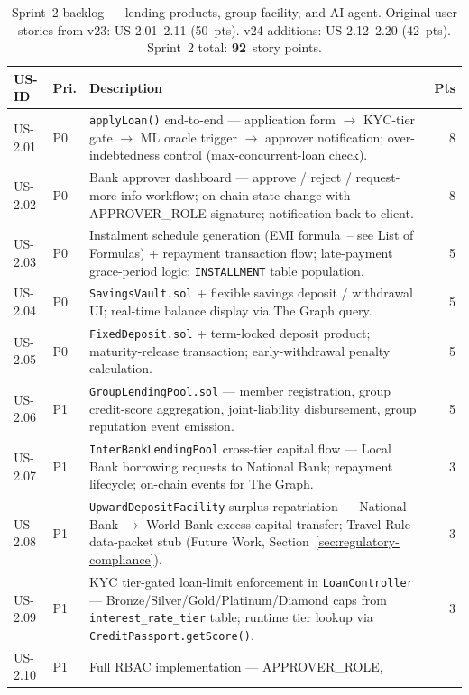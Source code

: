 \begin{table}[H]
\centering
\caption{Sprint~2 backlog --- lending products, group facility, and AI agent.
Original user stories from v23: US-2.01--2.11 (50~pts). v24 additions:
US-2.12--2.20 (42~pts). Sprint~2 total: \textbf{92}~story points.}
\label{tab:sprint2}
\small
\begin{tabular}{p{1.3cm}p{1.0cm}p{8.4cm}r}
\hline
\textbf{US-ID} & \textbf{Pri.} & \textbf{Description} & \textbf{Pts} \\
\hline
US-2.01 & P0 & \texttt{applyLoan()} end-to-end --- application form $\to$
  KYC-tier gate $\to$ ML oracle trigger $\to$ approver notification;
  over-indebtedness control (max-concurrent-loan check). & 8 \\
US-2.02 & P0 & Bank approver dashboard --- approve / reject / request-more-info
  workflow; on-chain state change with APPROVER\_ROLE signature;
  notification back to client. & 8 \\
US-2.03 & P0 & Instalment schedule generation (EMI formula~-- see List of
  Formulas) + repayment transaction flow; late-payment grace-period logic;
  \texttt{INSTALLMENT} table population. & 5 \\
US-2.04 & P0 & \texttt{SavingsVault.sol} + flexible savings deposit /
  withdrawal UI; real-time balance display via The Graph query. & 5 \\
US-2.05 & P0 & \texttt{FixedDeposit.sol} + term-locked deposit product;
  maturity-release transaction; early-withdrawal penalty calculation. & 5 \\
US-2.06 & P1 & \texttt{GroupLendingPool.sol} --- member registration, group
  credit-score aggregation, joint-liability disbursement, group reputation
  event emission. & 5 \\
US-2.07 & P1 & \texttt{InterBankLendingPool} cross-tier capital flow ---
  Local Bank borrowing requests to National Bank; repayment lifecycle;
  on-chain events for The Graph. & 3 \\
US-2.08 & P1 & \texttt{UpwardDepositFacility} surplus repatriation ---
  National Bank $\to$ World Bank excess-capital transfer; Travel Rule
  data-packet stub (Future Work, Section~\ref{sec:regulatory-compliance}).
  & 3 \\
US-2.09 & P1 & KYC tier-gated loan-limit enforcement in
  \texttt{LoanController} --- Bronze/Silver/Gold/Platinum/Diamond caps
  from \texttt{interest\_rate\_tier} table; runtime tier lookup via
  \texttt{CreditPassport.getScore()}. & 3 \\
US-2.10 & P1 & Full RBAC implementation --- APPROVER\_ROLE,

\end{tabular}
\end{table}

